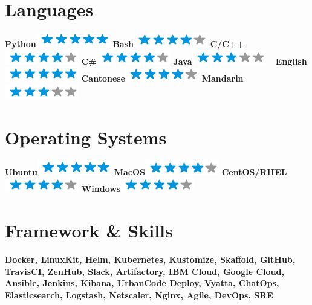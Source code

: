 \documentclass[]{friggeri-cv}
\begin{document}
\begin{aside}
  \section{Languages}
    \textbf{Python}\includegraphics[scale=0.40]{img/5stars.png}
    \textbf{Bash}\includegraphics[scale=0.40]{img/4stars.png}
    \textbf{C/C++}\includegraphics[scale=0.40]{img/4stars.png}
    \textbf{C\#}\includegraphics[scale=0.40]{img/4stars.png}
    \textbf{Java}\includegraphics[scale=0.40]{img/3stars.png}
    ~
    \textbf{English}\includegraphics[scale=0.40]{img/5stars.png}
    \textbf{Cantonese}\includegraphics[scale=0.40]{img/4stars.png}
    \textbf{Mandarin}\includegraphics[scale=0.40]{img/3stars.png}
    ~
  \section{Operating Systems}
    \textbf{Ubuntu}\includegraphics[scale=0.40]{img/5stars.png}
    \textbf{MacOS}\includegraphics[scale=0.40]{img/4stars.png}
    \textbf{CentOS/RHEL}\includegraphics[scale=0.40]{img/4stars.png}
    \textbf{Windows}\includegraphics[scale=0.40]{img/4stars.png}
    ~
  \section{Framework \& Skills}
    \textbf{Docker, LinuxKit, Helm, Kubernetes, Kustomize, Skaffold, GitHub, TravisCI, ZenHub, Slack, Artifactory, IBM Cloud, Google Cloud, Ansible, Jenkins, Kibana, UrbanCode Deploy, Vyatta, ChatOps, Elasticsearch, Logstash, Netscaler, Nginx, Agile, DevOps, SRE}
\end{aside}
\end{document}

